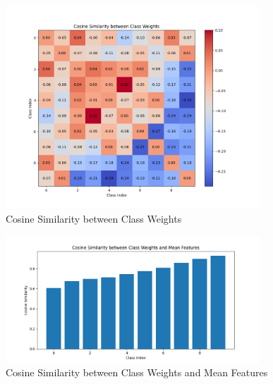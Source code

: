\documentclass{article}
\begin{document}
\begin{figure}[h!]
\centering
\includegraphics[width=0.85\textwidth]{Plot/VS/VS_cos_190_gm015_tau125.png}
\caption{Cosine Similarity between Class Weights}
\end{figure}
\hfill
\begin{figure}[h!]
\centering
\includegraphics[width=0.85\textwidth]{Plot/VS/VS_WiHi_190_gm015_tau125.png}
\caption{Cosine Similarity between Class Weights and Mean Features}
\end{figure}




\newpage
\end{document}
